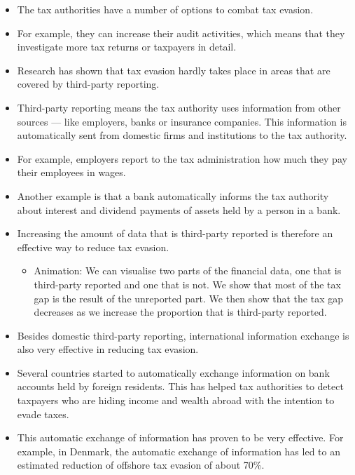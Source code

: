 \documentclass[11pt]{article}
\begin{document}
\begin{itemize}
\begin{itemize}
\end{itemize}
\item The tax authorities have a number of options to combat tax evasion.
\item For example, they can increase their audit activities, which means that they investigate more tax returns or taxpayers in detail.  
\item Research has shown that tax evasion hardly takes place in areas that are covered by third-party reporting.
\item Third-party reporting means the tax authority uses information from other sources --- like employers, banks or insurance companies. This information is automatically sent from domestic firms and institutions to the tax authority.
\item For example, employers report to the tax administration how much they pay their employees in wages.
\item Another example is that a bank automatically informs the tax authority about interest and dividend payments of assets held by a person in a bank.
\item Increasing the amount of data that is third-party reported is therefore an effective way to reduce tax evasion.
\begin{itemize}
    \item Animation: We can visualise two parts of the financial data, one that is third-party reported and one that is not. We show that most of the tax gap is the result of the unreported part. We then show that the tax gap decreases as we increase the proportion that is third-party reported.
\end{itemize}
\item Besides domestic third-party reporting, international information exchange is also very effective in reducing tax evasion.  
\item Several countries started to automatically exchange information on bank accounts held by foreign residents. This has helped tax authorities to detect taxpayers who are hiding income and wealth abroad with the intention to evade taxes.
\item This automatic exchange of information has proven to be very effective. For example, in Denmark, the automatic exchange of information has led to an estimated reduction of offshore tax evasion of about 70\%.
\end{itemize}
\end{document}
